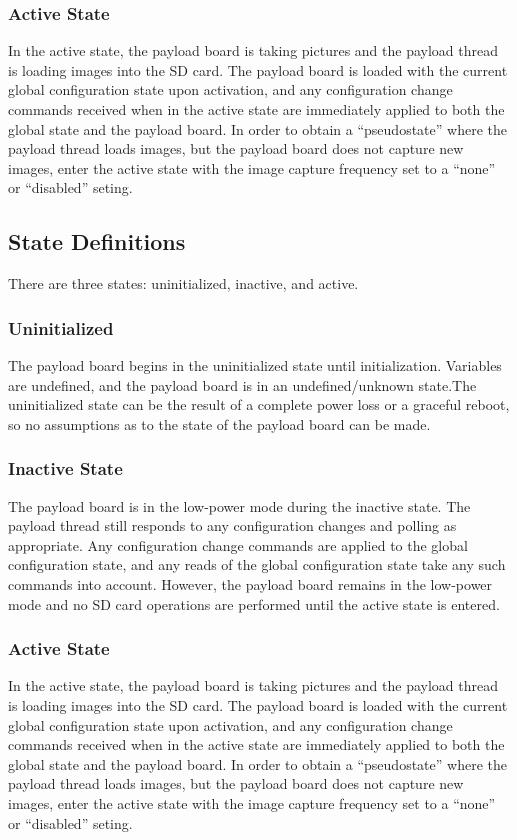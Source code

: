 \documentclass[10pt]{extarticle}
\begin{document}
\subsubsection{Active State}
In the active state, the payload board is taking pictures and the payload thread
is loading images into the SD card. The payload board is loaded with the current
global configuration state upon activation, and any configuration change
commands received when in the active state are immediately applied to both
the global state and the payload board.
In order to obtain a 
``pseudostate'' where the payload thread loads images, but the payload board
does not capture new images, enter the active state with the image capture
frequency set to a ``none'' or ``disabled'' seting.

\subsection{State Definitions}
There are three states: uninitialized, inactive, and active.

\subsubsection{Uninitialized}
The payload board begins in the uninitialized state until initialization.
Variables are undefined, and the payload board is in an undefined/unknown state.The uninitialized state can be the result of a complete power loss or a graceful
reboot, so no assumptions as to the state of the payload board can be made.

\subsubsection{Inactive State}
The payload board is in the low-power mode during the inactive state. The
payload thread still responds to any configuration changes and polling as
appropriate. Any configuration change commands are applied to the global
configuration state, and any reads of the global configuration state take any
such
commands into account. However, the payload board remains in the low-power mode
and no SD card operations are performed until the active state is entered.

\subsubsection{Active State}
In the active state, the payload board is taking pictures and the payload thread
is loading images into the SD card. The payload board is loaded with the current
global configuration state upon activation, and any configuration change
commands received when in the active state are immediately applied to both
the global state and the payload board.
In order to obtain a 
``pseudostate'' where the payload thread loads images, but the payload board
does not capture new images, enter the active state with the image capture
frequency set to a ``none'' or ``disabled'' seting.
\end{document}
